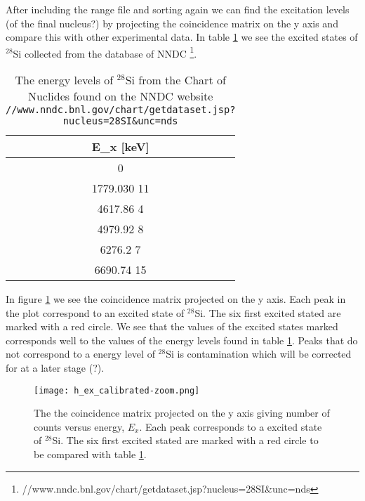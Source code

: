 \documentclass[11pt,a4wide]{article}
\begin{document}
After including the range file and sorting again we can find the excitation levels (of the final nucleus?) by projecting the coincidence matrix on the y axis and compare this with other experimental data. In table \ref{tab: e_levels} we see the excited states of ${}^{28}$Si collected from the database of NNDC \footnote{//www.nndc.bnl.gov/chart/getdataset.jsp?nucleus=28SI\&unc=nds}. 

\begin{table}
\centering
\caption{The energy levels of ${}^{28}$Si from the Chart of Nuclides found on the NNDC website \texttt{//www.nndc.bnl.gov/chart/getdataset.jsp?nucleus=28SI\&unc=nds}}
\begin{tabular}{|c|}
\hline 
E\_x [keV] \\ 
\hline 
0 \\ 
\hline 
1779.030 11 \\ 
\hline 
4617.86 4 \\ 
\hline 
4979.92 8 \\ 
\hline 
6276.2 7 \\ 
\hline 
6690.74 15 \\ 
\hline 
\end{tabular} 
\label{tab: e_levels}
\end{table}

In figure \ref{fig: proj_y_excitation} we see the coincidence matrix projected on the y axis. Each peak in the plot correspond to an excited state of ${}^{28}$Si. The six first excited stated are marked with a red circle. We see that the values of the excited states marked corresponds well to the values of the energy levels found in table \ref{tab: e_levels}. Peaks that do not correspond to a energy level of ${}^{28}$Si is contamination which will be corrected for at a later stage (?). 

\begin{figure}[htp]
\centering
\texttt{[image: h\_ex\_calibrated-zoom.png]}
\caption{The the coincidence matrix projected on the y axis giving number of counts versus energy, $E_x$. Each peak corresponds to a excited state of ${}^{28}$Si. The six first excited stated are marked with a red circle to be compared with table \ref{tab: e_levels}. }
\label{fig: proj_y_excitation}
\end{figure}

\end{document}
